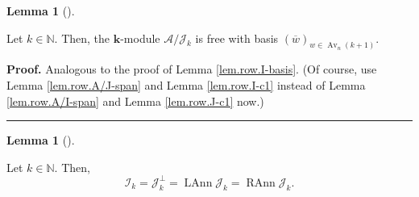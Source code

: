 \documentclass[numbers=enddot,12pt,final,onecolumn,notitlepage]{scrartcl}%
\numberwithin{exer}{subsection}
\theoremstyle{definition}
\newtheorem{lem}[theo]{Lemma}
\newenvironment{lemma}[1][]
{\begin{lem}[#1]\begin{leftbar}}
{\end{leftbar}\end{lem}}
\newenvironment{proof}[1][Proof]{\noindent\textbf{#1.} }{\ \rule{0.5em}{0.5em}}
\begin{document}
\begin{lemma}
\label{lem.row.J-basis}Let $k\in\mathbb{N}$. Then, the $\mathbf{k}$-module
$\mathcal{A}/\mathcal{J}_{k}$ is free with basis $\left(  \overline{w}\right)
_{w\in\operatorname*{Av}\nolimits_{n}\left(  k+1\right)  }$.
\end{lemma}

\begin{proof}
Analogous to the proof of Lemma \ref{lem.row.I-basis}. (Of course, use Lemma
\ref{lem.row.A/J-span} and Lemma \ref{lem.row.I-c1} instead of Lemma
\ref{lem.row.A/I-span} and Lemma \ref{lem.row.J-c1} now.)
\end{proof}

\begin{lemma}
\label{lem.row.Ikperp}Let $k\in\mathbb{N}$. Then,
\[
\mathcal{I}_{k}=\mathcal{J}_{k}^{\perp}=\operatorname*{LAnn}\mathcal{J}%
_{k}=\operatorname*{RAnn}\mathcal{J}_{k}.
\]

\end{lemma}
\end{document}
